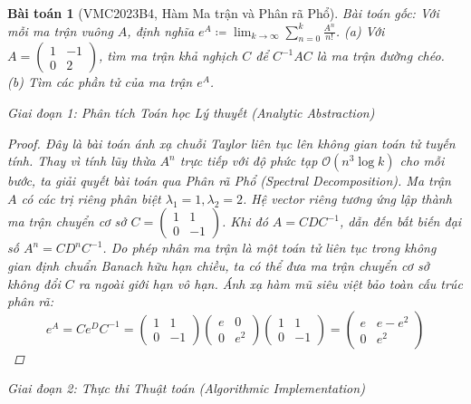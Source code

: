 \documentclass{article}
\newtheorem{baitoan}{Bài toán}
\begin{document}
\begin{baitoan}[VMC2023B4, Hàm Ma trận và Phân rã Phổ]
 \emph{Bài toán gốc:} 
 Với mỗi ma trận vuông $A$, định nghĩa $e^A\coloneqq\lim_{k\to\infty} \sum_{n=0}^k \frac{A^n}{n!}$.
 (a) Với $A = \begin{pmatrix} 1 & -1\\0 & 2 \end{pmatrix}$, tìm ma trận khả nghịch $C$ để $C^{-1}AC$ là ma trận đường chéo. 
 (b) Tìm các phần tử của ma trận $e^A$.

\vspace{0.5em}\noindent\emph{Giai đoạn 1: Phân tích Toán học Lý thuyết (Analytic Abstraction)}
 
\begin{proof}
 Đây là bài toán ánh xạ chuỗi Taylor liên tục lên không gian toán tử tuyến tính. Thay vì tính lũy thừa $A^n$ trực tiếp với độ phức tạp $\mathcal{O}(n^3 \log k)$ cho mỗi bước, ta giải quyết bài toán qua Phân rã Phổ (Spectral Decomposition).
 Ma trận $A$ có các trị riêng phân biệt $\lambda_1 = 1, \lambda_2 = 2$. Hệ vector riêng tương ứng lập thành ma trận chuyển cơ sở $C = \begin{pmatrix} 1 & 1 \\ 0 & -1 \end{pmatrix}$. 
 Khi đó $A = C D C^{-1}$, dẫn đến bất biến đại số $A^n = C D^n C^{-1}$. Do phép nhân ma trận là một toán tử liên tục trong không gian định chuẩn Banach hữu hạn chiều, ta có thể đưa ma trận chuyển cơ sở không đổi $C$ ra ngoài giới hạn vô hạn. Ánh xạ hàm mũ siêu việt bảo toàn cấu trúc phân rã:
 \begin{equation}
 e^A = C e^D C^{-1} = \begin{pmatrix} 1 & 1 \\ 0 & -1 \end{pmatrix} \begin{pmatrix} e & 0 \\ 0 & e^2 \end{pmatrix} \begin{pmatrix} 1 & 1 \\ 0 & -1 \end{pmatrix} = \begin{pmatrix} e & e - e^2 \\ 0 & e^2 \end{pmatrix}
 \end{equation}
 \end{proof}

\vspace{0.5em}\noindent\emph{Giai đoạn 2: Thực thi Thuật toán (Algorithmic Implementation)}
 

\end{baitoan}
\end{document}
